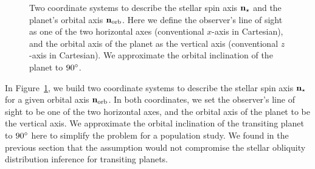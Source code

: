 \documentclass[twocolumn,times]{aastex631}
\begin{document}
\begin{figure*}[ht!]
    \vspace*{-1.5cm}
    \caption{Two coordinate systems to describe the stellar spin axis $\bf{n}_{\star}$ and the planet's orbital axis $\bf{n}_{\rm orb}$. Here we define the observer's line of sight as one of the two horizontal axes (conventional $x$-axis in Cartesian), and the orbital axis of the planet as the vertical axis (conventional $z$-axis in Cartesian). We approximate the orbital inclination of the planet to $90\mbox{$^\circ$}$.}
    \label{fig:coord}
\end{figure*}

In Figure~\ref{fig:coord}, we build two coordinate systems to describe the stellar spin axis $\bf{n}_{\star}$ for a given orbital axis $\bf{n}_{\rm orb}$. In both coordinates, we set the observer's line of sight to be one of the two horizontal axes, and the orbital axis of the planet to be the vertical axis. We approximate the orbital inclination of the transiting planet to $90\mbox{$^\circ$}$ here to simplify the problem for a population study. We found in the previous section that the assumption would not compromise the stellar obliquity distribution inference for transiting planets.
\end{document}
